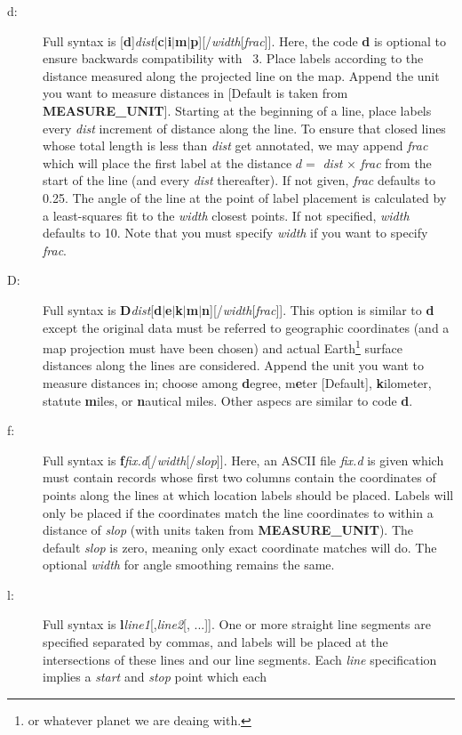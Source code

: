 \begin{description}
\item [d:] Full syntax is [{\bf d}]{\it dist}[{\bf c$|$i$|$m$|$p}][/{\it width}[{\it frac}]].
Here, the code {\bf d} is optional to ensure backwards compatibility with \GMT\ 3.
Place labels according to the distance measured along the projected line on the map.  Append the
unit you want to measure distances in [Default is taken from {\bf MEASURE\_UNIT}].
Starting at the beginning of a line, place labels every {\it dist} increment of
distance along the line.  To ensure that closed lines whose total length is less
than {\it dist} get annotated, we may append {\it frac} which will place the first
label at the distance $d =$ {\it dist} $\times$ {\it frac} from the start of the
line (and every {\it dist} thereafter).  If not given, {\it frac} defaults to 0.25.
The angle of the line at the point of label placement is calculated by a least-squares
fit to the {\it width} closest points.  If not specified, {\it width} defaults to 10.
Note that you must specify {\it width} if you want to specify {\it frac}.
\item [D:] Full syntax is {\bf D}{\it dist}[{\bf d$|$e$|$k$|$m$|$n}][/{\it width}[{\it frac}]].
This option is similar to {\bf d} except the original data must be referred to geographic
coordinates (and a map projection must have been chosen) and actual Earth\footnote{or whatever
planet we are deaing with.} surface distances along the lines are considered.  Append the
unit you want to measure distances in; choose among {\bf d}egree, m{\bf e}ter [Default],
{\bf k}ilometer, statute {\bf m}iles, or {\bf n}autical miles.  Other aspecs are similar to code {\bf d}.
\item [f:] Full syntax is {\bf f}{\it fix.d}[/{\it width}[/{\it slop}]].  Here, an ASCII file {\it fix.d} is
given which must contain records whose first two columns contain the coordinates of points along
the lines at which location labels should be placed.  Labels will only be placed if the coordinates
match the line coordinates to within a distance of {\it slop} (with units taken from {\bf MEASURE\_UNIT}).
The default {\it slop} is zero, meaning only exact coordinate matches will do.  The optional {\it width}
for angle smoothing remains the same.
\item [l:] Full syntax is {\bf l}{\it line1}[,{\it line2}[, ...]].  One or more straight line segments
are specified separated by commas, and labels will be placed at the intersections of these lines and
our line segments.  Each {\it line} specification implies a {\it start} and {\it stop} point which each

\end{description}
